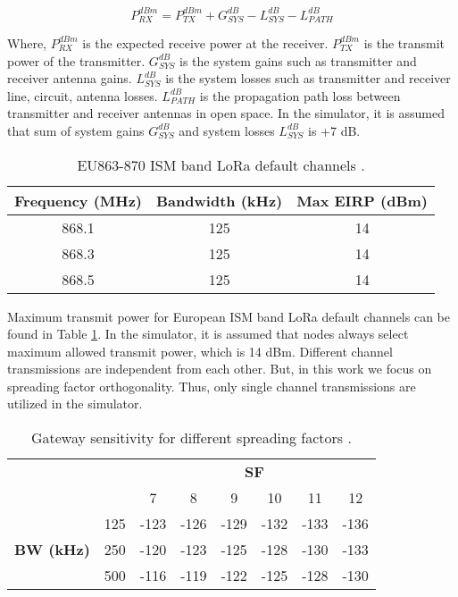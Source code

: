 \begin{equation} \label{eq:expected_rx_power}
P^{dBm}_{RX} = P^{dBm}_{TX} + G^{dB}_{SYS} - L^{dB}_{SYS} - L^{dB}_{PATH}
\end{equation}

Where, $P^{dBm}_{RX}$ is the expected receive power at the receiver. $P^{dBm}_{TX}$ is the transmit power of the transmitter. $G^{dB}_{SYS}$ is the system gains such as transmitter and receiver antenna gains. $L^{dB}_{SYS}$ is the system losses such as transmitter and receiver line, circuit, antenna losses. $L^{dB}_{PATH}$ is the propagation path loss between transmitter and receiver antennas in open space. In the simulator, it is assumed that sum of system gains $G^{dB}_{SYS}$ and system losses $L^{dB}_{SYS}$ is +7 dB.

\begin{table}
\centering
\caption{EU863-870 ISM band LoRa default channels \cite{lorawan.regional.parameters}.}
\label{table:max_tx_power}
\begin{tabular}{|c|c|c|}
\hline
\textbf{Frequency (MHz)} & \textbf{Bandwidth (kHz)} & \textbf{Max EIRP (dBm)} \\ \hline
      868.1 &   125 &   14 \\ \hline
      868.3 &   125 &   14 \\ \hline
      868.5 &   125 &   14 \\ \hline
\end{tabular}
\end{table}

Maximum transmit power for European ISM band LoRa default channels can be found in Table \ref{table:max_tx_power}. In the simulator, it is assumed that nodes always select maximum allowed transmit power, which is 14 dBm. Different channel transmissions are independent from each other. But, in this work we focus on spreading factor orthogonality. Thus, only single channel transmissions are utilized in the simulator.

\begin{table}
\centering
\caption{Gateway sensitivity for different spreading factors \cite{SX1276}.}
\label{table:gw_sf_sensitivity}
\begin{tabular}{|c|c|c|c|c|c|c|c|}
\hline
\multicolumn{2}{|c|}{\multirow{2}{*}{}} & \multicolumn{6}{c|}{\textbf{SF}} \\ \cline{3-8}
\multicolumn{2}{|c|}{}                  &    7 &    8 &    9 &   10 &   11 &   12 \\ \hline
\multirow{3}{*}{\textbf{BW (kHz)}}  & 125 & -123 & -126 & -129 & -132 & -133 & -136 \\ \cline{2-8}
                                    & 250 & -120 & -123 & -125 & -128 & -130 & -133 \\ \cline{2-8}
                                    & 500 & -116 & -119 & -122 & -125 & -128 & -130 \\ \hline
\end{tabular}
\end{table}

